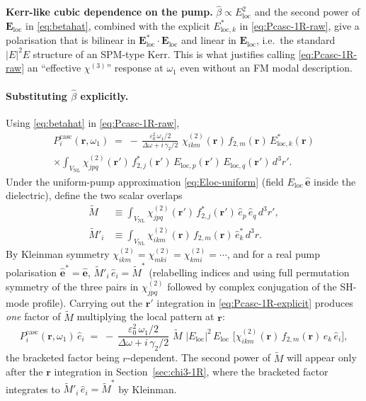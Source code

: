\documentclass[11pt,a4paper]{article}
\newcommand{\eps}{\varepsilon}
\newcommand{\bvec}[1]{\mathbf{#1}}
\newcommand{\E}{\bvec{E}}
\newcommand{\ri}{\bvec{r}}
\newcommand{\chitwo}{\chi^{(2)}}
\newcommand{\chithree}{\chi^{(3)}}
\newcommand{\Dom}{\Delta\omega}
\newcommand{\Einc}{\E_{\text{loc}}}
\newcommand{\VNL}{V_{\text{NL}}}
\begin{document}
\textbf{Kerr-like cubic dependence on the pump.}
$\hat\beta\propto E_\text{loc}^{2}$ and the second power of $\Einc$ in
\eqref{eq:betahat}, combined with the explicit $E_{\text{loc},k}^{*}$ in
\eqref{eq:Pcasc-1R-raw}, give a polarisation that is bilinear in
$\Einc^{*}\!\cdot\!\Einc$ and linear in $\Einc$, i.e.\ the standard
$|E|^{2}E$ structure of an SPM-type Kerr.  This is what justifies calling
\eqref{eq:Pcasc-1R-raw} an ``effective $\chithree$'' response at $\omega_1$
even without an FM modal description.

\paragraph{Substituting $\hat\beta$ explicitly.}
Using \eqref{eq:betahat} in \eqref{eq:Pcasc-1R-raw},
\begin{multline}
  P_i^{\text{casc}}(\ri,\omega_1)\;=\;
   -\,\frac{\eps_0^{2}\,\omega_1/2}{\Dom+i\,\gamma_2/2}\,\,
     \chitwo_{ikm}(\ri)\,f_{2,m}(\ri)\,E_{\text{loc},k}^{*}(\ri)\\
   \times\!\int_{\VNL}\!\chitwo_{jpq}(\ri')\,f_{2,j}^{*}(\ri')\,
                    E_{\text{loc},p}(\ri')\,E_{\text{loc},q}(\ri')\,d^{3}r'.
  \label{eq:Pcasc-1R-explicit}
\end{multline}
Under the uniform-pump approximation \eqref{eq:Eloc-uniform}
(field $E_\text{loc}\,\hat{\bm e}$ inside the dielectric), define the
two scalar overlaps
\begin{align}
  \widetilde M
   &\equiv\!\int_{\VNL}\!\chitwo_{jpq}(\ri')\,f_{2,j}^{*}(\ri')\,
            \hat e_p\,\hat e_q\,d^{3}r',
   \label{eq:Mtilde-def}\\[3pt]
  \widetilde M'_i
   &\equiv\!\int_{\VNL}\!\chitwo_{ikm}(\ri)\,f_{2,m}(\ri)\,
            \hat e_k^{*}\,d^{3}r.
   \label{eq:Mtildeprime-def}
\end{align}
By Kleinman symmetry $\chitwo_{ikm}=\chitwo_{mki}=\chitwo_{kmi}=\cdots$,
and for a real pump polarisation $\hat{\bm e}^{*}=\hat{\bm e}$,
$\widetilde M'_i\,\hat e_i = \widetilde M^{*}$ (relabelling indices and
using full permutation symmetry of the three pairs in $\chitwo_{jpq}$
followed by complex conjugation of the SH-mode profile).  Carrying out the
$\ri'$ integration in \eqref{eq:Pcasc-1R-explicit} produces \emph{one}
factor of $\widetilde M$ multiplying the local pattern at $\ri$:
\begin{equation}
  P_i^{\text{casc}}(\ri,\omega_1)\,\hat e_i
   \;=\;-\,\frac{\eps_0^{2}\,\omega_1/2}{\Dom+i\,\gamma_2/2}\,
        \,\widetilde M\,\,|E_\text{loc}|^{2}\,E_\text{loc}\,
        \,\bigl[\chitwo_{ikm}(\ri)\,f_{2,m}(\ri)\,\hat e_k\,\hat e_i\bigr],
  \label{eq:Pcasc-1R-collected}
\end{equation}
the bracketed factor being $r$-dependent.  The second power of $\widetilde M$
will appear only after the $\ri$ integration in
Section~\ref{sec:chi3-1R}, where the bracketed factor integrates to
$\widetilde M'_i\,\hat e_i=\widetilde M^{*}$ by Kleinman.
\end{document}
